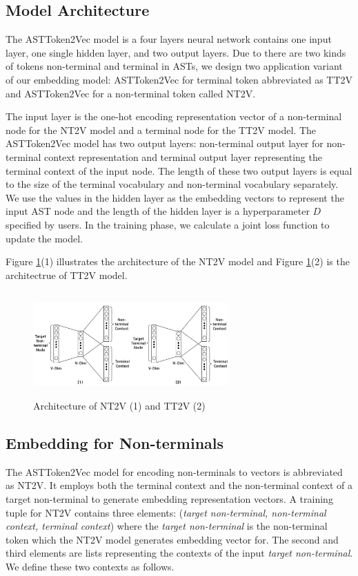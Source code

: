 \documentclass[T, E]{compsoft}
\begin{document}
\subsection{Model Architecture}
The ASTToken2Vec model is a four layers neural network contains one input layer, one single hidden layer, and two output layers. 
Due to there are two kinds of tokens non-terminal and terminal in ASTs, we design two application variant of our embedding model: ASTToken2Vec for terminal token abbreviated as TT2V and ASTToken2Vec for a non-terminal token called NT2V.

The input layer is the one-hot encoding representation vector of a non-terminal node for the NT2V model and a terminal node for the TT2V model. 
The ASTToken2Vec model has two output layers: non-terminal output layer for non-terminal context representation and terminal output layer representing the terminal context of the input node. 
The length of these two output layers is equal to the size of the terminal vocabulary and non-terminal vocabulary separately.
We use the values in the hidden layer as the embedding vectors to represent the input AST node and the length of the hidden layer is a hyperparameter $D$ specified by users. 
In the training phase, we calculate a joint loss function to update the model.

Figure \ref{fig:node2vec-structure}(1) illustrates the architecture of the NT2V model and Figure \ref{fig:node2vec-structure}(2) is the architectrue of TT2V model.

\begin{figure}[!ht]
\centering
\includegraphics[width=7.5cm, height=4cm]{pictures/node2vec_structure.png}
\caption{Architecture of NT2V (1) and TT2V (2)}
\label{fig:node2vec-structure}
\end{figure}



\subsection{Embedding for Non-terminals}
\label{sub:embedding_nt}
The ASTToken2Vec model for encoding non-terminals to vectors is abbreviated as NT2V. 
It employs both the terminal context and the non-terminal context of a target non-terminal to generate embedding representation vectors.
A training tuple for NT2V contains three elements: (\textit{target non-terminal, non-terminal context, terminal context}) where the \textit{target non-terminal} is the non-terminal token which the NT2V model generates embedding vector for. 
The second and third elements are lists representing the contexts of the input \textit{target non-terminal}.
We define these two contexts as follows.
\end{document}
